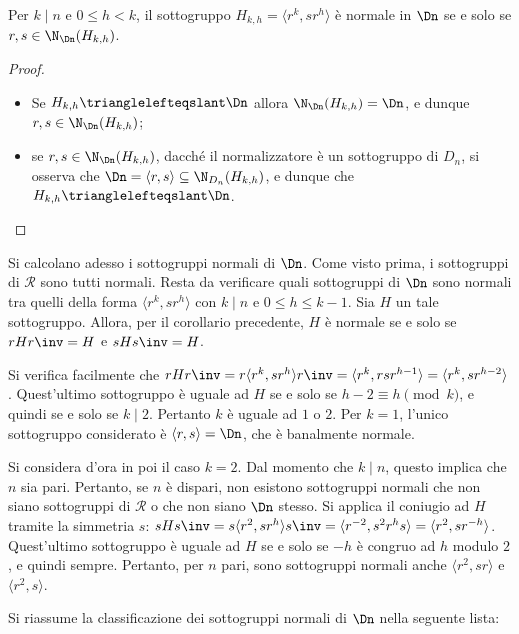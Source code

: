 \documentclass[11pt]{scrartcl}
\begin{document}
	\begin{corollary}
		Per $k\mid n$ e $0\leq h < k$, il sottogruppo $H_{k, h} = \langle r^k, sr^h\rangle$
		è normale in $\Dn$ se e solo se $r, s \in \N_{\Dn}(H_{k, h})$.
	\end{corollary}
	
	\begin{proof}~
		\begin{itemize}
			\item Se $H_{k, h}\trianglelefteqslant \Dn$ allora $\N_{\Dn}(H_{k, h}) = \Dn$, 
			e dunque $r, s \in \N_{\Dn}(H_{k, h})$;
			\item se $r, s \in \N_{\Dn}(H_{k, h})$, dacché il normalizzatore è un
			sottogruppo di $D_n$, si osserva che $\Dn = \langle r, s\rangle \subseteq
			\N_{D_n}(H_{k, h})$, e dunque che $H_{k, h} \trianglelefteqslant \Dn$.
		\end{itemize}
	\end{proof}
	
	Si calcolano adesso i sottogruppi normali di $\Dn$. Come visto prima, i sottogruppi
	di $\mathcal{R}$ sono tutti normali. Resta da verificare quali sottogruppi di $\Dn$
	sono normali tra quelli
	della forma $\langle r^k, sr^h \rangle$ con $k \mid n$ e $0 \leq h \leq k-1$.
	Sia $H$ un tale sottogruppo. Allora, per il corollario precedente, $H$ è normale
	se e solo se $rHr\inv = H$ e $sHs\inv = H$. \medskip
	
	
	Si verifica facilmente
	che $rHr\inv = r \langle r^k, sr^h \rangle r\inv = \langle r^k, rsr^{h-1} \rangle
	= \langle r^k, sr^{h-2} \rangle$. Quest'ultimo sottogruppo è uguale ad $H$ se e
	solo se $h-2 \equiv h \pmod k$, e quindi se e solo se $k \mid 2$. Pertanto
	$k$ è uguale ad $1$ o $2$. Per $k = 1$, l'unico sottogruppo considerato è
	$\langle r, s \rangle = \Dn$, che
	è banalmente normale. \medskip
	
	
	Si considera d'ora in poi il caso $k = 2$. Dal momento che $k \mid n$, questo
	implica che $n$ sia pari. Pertanto, se $n$ è dispari, non esistono sottogruppi
	normali che non siano sottogruppi di $\mathcal{R}$ o che non siano $\Dn$ stesso.
	Si applica il coniugio ad $H$ tramite la simmetria $s$:
	$sHs\inv = s \langle r^2, sr^h \rangle s\inv = \langle r^{-2}, s^2 r^h s \rangle =
	\langle r^2, s r^{-h} \rangle$. Quest'ultimo sottogruppo è uguale ad $H$ se e solo
	se $-h$ è congruo ad $h$ modulo $2$, e quindi sempre. Pertanto, per $n$ pari,
	sono sottogruppi normali anche $\langle r^2, sr \rangle$ e $\langle r^2, s \rangle$. \medskip
	
	Si riassume la classificazione dei sottogruppi normali di $\Dn$ nella seguente lista:
	
\end{document}
